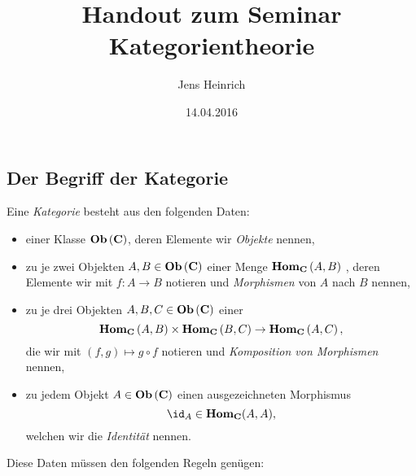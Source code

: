 \documentclass{article}
\title{Handout zum Seminar Kategorientheorie}
\author{Jens Heinrich}
\date{14.04.2016}
\begin{document}
\maketitle
\begin{defi}[Kategorie]
\section{Der Begriff der Kategorie}
		\cite[Definition 2.2.2]{Bra}
		Eine \emph{Kategorie} \CatC besteht aus den folgenden Daten:
		\begin{itemize}
			\item einer Klasse \(  \mathbf{Ob}  \left( \mathbf{C} \right) \), deren Elemente wir \emph{Objekte} nennen,
			\item zu je zwei Objekten 
			\begin{math}
				A,B \in  \mathbf{Ob}  \left( \mathbf{C}  \right) 
			\end{math}
			einer Menge 
			\begin{math}
				 \mathbf{Hom } _\mathbf{C} \left( A,B \right) 
			\end{math}
			, deren Elemente wir mit 
			\begin{math}
				f : A \to B 
			\end{math}
			notieren und \emph{Morphismen} von $ A $ nach $ B $ nennen,
			\item zu je drei Objekten 
			\begin{math}
		 A,B,C \in  \mathbf{Ob}  \left( \mathbf{C}  \right) 
			\end{math}	
			einer \Abb 
			\begin{displaymath}
				 \mathbf{Hom } _\mathbf{C} \left( A,B \right) \times  \mathbf{Hom } _\mathbf{C} \left( B,C \right) \to  \mathbf{Hom } _\mathbf{C} \left( A,C \right) ,
			\end{displaymath}
			die wir mit 
			\begin{math}
				\left( f,g \right) \mapsto g \circ f
			\end{math}
			notieren und \emph{Komposition von Morphismen} nennen, 
		\item zu jedem Objekt 
			\begin{math}
				A \in  \mathbf{Ob}  \left( \mathbf{C} \right)
			\end{math} 	
			einen ausgezeichneten Morphismus 
			\begin{displaymath}
				\id_A \in \Hom_\CatC ( A,A) ,
			\end{displaymath}
			welchen wir die \emph{Identit\"at} nennen.
		\end{itemize}
			Diese Daten m\"ussen den folgenden Regeln gen\"ugen:
			\begin{itemize}

\end{itemize}
\end{defi}
\end{document}
